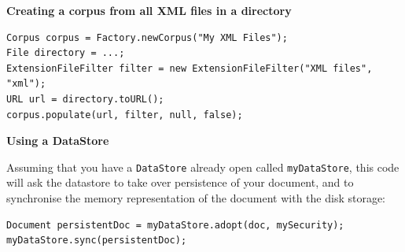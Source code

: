 \begin{minipage}{\textwidth}

{\bf Creating a corpus from all XML files in a directory}


\begin{lstlisting}
Corpus corpus = Factory.newCorpus("My XML Files");
File directory = ...;
ExtensionFileFilter filter = new ExtensionFileFilter("XML files", "xml");
URL url = directory.toURL();
corpus.populate(url, filter, null, false);
\end{lstlisting}

\end{minipage}

{\bf Using a DataStore}

Assuming that you have a {\tt DataStore} already open called {\tt myDataStore},
this code will ask the datastore to take over persistence of your document, and
to synchronise the memory representation of the document with the disk storage:
\begin{small}\begin{verbatim}
Document persistentDoc = myDataStore.adopt(doc, mySecurity);
myDataStore.sync(persistentDoc);
\end{verbatim}\end{small}



